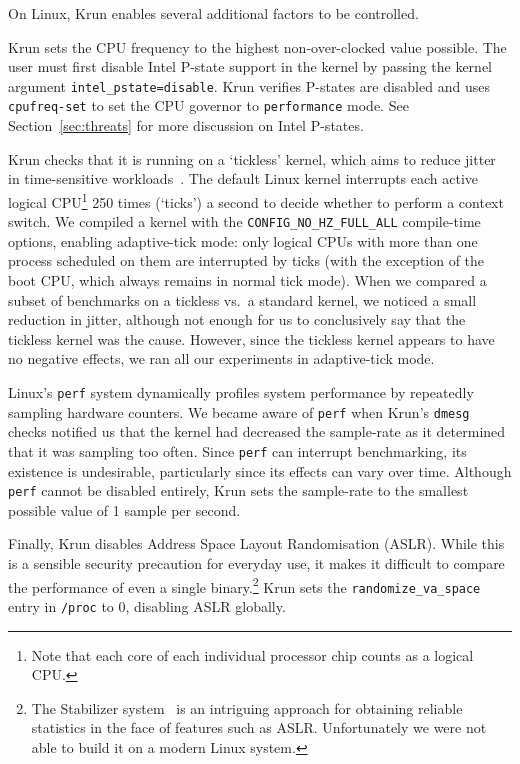 \documentclass[a4paper,UKenglish]{lipics}
\newcommand{\krun}{Krun\xspace}
\begin{document}
On Linux, \krun enables several additional factors to be controlled.

\krun sets the CPU frequency to the highest non-over-clocked value possible.
The user must first disable Intel P-state support in
the kernel by passing the kernel argument \texttt{intel\_pstate=disable}.
\krun verifies P-states are disabled and uses \texttt{cpufreq-set} to set
the CPU governor to \texttt{performance} mode. See
Section~\ref{sec:threats} for more discussion on Intel P-states.

\krun checks that it is running on a `tickless' kernel, which aims to reduce
jitter in time-sensitive workloads~\cite{tickless}. The default
Linux kernel interrupts each active logical CPU\footnote{Note that each core of
each individual processor chip counts as a logical CPU.} 250 times (`ticks') a second to
decide whether to perform a context switch. We compiled a kernel with the
\texttt{CONFIG\_NO\_HZ\_FULL\_ALL} compile-time options, enabling adaptive-tick
mode: only logical CPUs with more than one process scheduled on them are
interrupted by ticks (with the exception of the boot CPU, which always remains
in normal tick mode).
When we compared a subset of benchmarks on a tickless vs.~a standard
kernel, we noticed a small reduction in jitter, although not enough for us to
conclusively say that the tickless kernel was the cause. However,
since the tickless kernel appears to have no negative effects, we ran all
our experiments in adaptive-tick mode.

Linux's \texttt{perf} system dynamically profiles system performance by
repeatedly sampling hardware counters. We became aware of \texttt{perf} when
\krun's \texttt{dmesg} checks notified us that the kernel had decreased the
sample-rate as it determined that it was sampling too often. Since \texttt{perf}
can interrupt benchmarking, its existence is undesirable, particularly since its
effects can vary over time. Although \texttt{perf} cannot be disabled entirely,
\krun sets the sample-rate to the smallest possible value of 1 sample per
second.

Finally, \krun disables Address Space Layout Randomisation (ASLR). While this is
a sensible security precaution for everyday use, it makes it difficult to
compare the performance of even a single binary.\footnote{The Stabilizer
system~\cite{curtsinger13stabilizer} is an intriguing approach for obtaining reliable
statistics in the face of features such as ASLR. Unfortunately we were not able
to build it on a modern Linux system.} \krun sets the
\texttt{randomize\_va\_space} entry in \texttt{/proc} to 0, disabling ASLR
globally.
\end{document}
